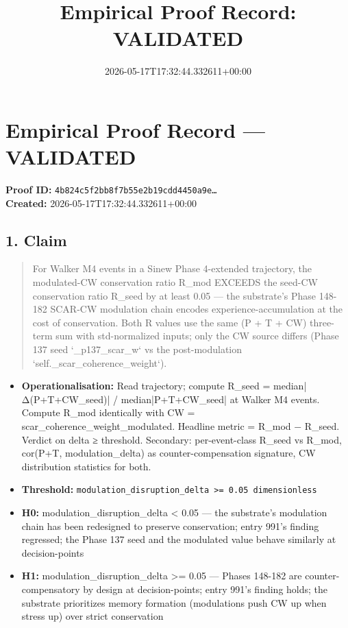 \documentclass{article}
\title{Empirical Proof Record: VALIDATED}
\date{2026-05-17T17:32:44.332611+00:00}
\begin{document}
\maketitle
\section*{Empirical Proof Record --- \textcolor{validated}{\textbf{VALIDATED}}}
\textbf{Proof ID:} \texttt{4b824c5f2bb8f7b55e2b19cdd4450a9e\dots}\\
\textbf{Created:} 2026-05-17T17:32:44.332611+00:00
\subsection*{1. Claim}
\begin{quote}For Walker M4 events in a Sinew Phase 4-extended trajectory, the modulated-CW conservation ratio R\_mod EXCEEDS the seed-CW conservation ratio R\_seed by at least 0.05 — the substrate's Phase 148-182 SCAR-CW modulation chain encodes experience-accumulation at the cost of conservation. Both R values use the same (P + T + CW) three-term sum with std-normalized inputs; only the CW source differs (Phase 137 seed `\_p137\_scar\_w` vs the post-modulation `self.\_scar\_coherence\_weight`).\end{quote}
\begin{itemize}
\item \textbf{Operationalisation:} Read trajectory; compute R\_seed = median|Δ(P+T+CW\_seed)| / median|P+T+CW\_seed| at Walker M4 events. Compute R\_mod identically with CW = scar\_coherence\_weight\_modulated. Headline metric = R\_mod − R\_seed. Verdict on delta ≥ threshold. Secondary: per-event-class R\_seed vs R\_mod, cor(P+T, modulation\_delta) as counter-compensation signature, CW distribution statistics for both.
\item \textbf{Threshold:} \texttt{modulation\_disruption\_delta >= 0.05 dimensionless}
\item \textbf{H0:} modulation\_disruption\_delta < 0.05 — the substrate's modulation chain has been redesigned to preserve conservation; entry 991's finding regressed; the Phase 137 seed and the modulated value behave similarly at decision-points
\item \textbf{H1:} modulation\_disruption\_delta >= 0.05 — Phases 148-182 are counter-compensatory by design at decision-points; entry 991's finding holds; the substrate prioritizes memory formation (modulations push CW up when stress up) over strict conservation
\end{itemize}
\end{document}
